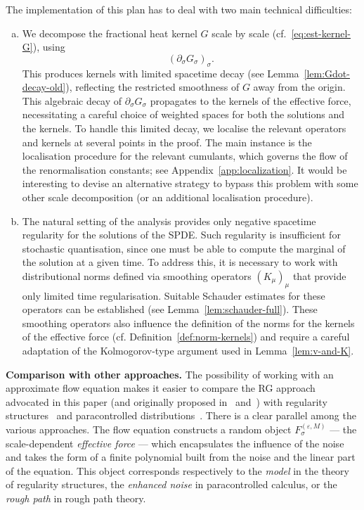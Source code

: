 \documentclass{article}
\numberwithin{equation}{section}
\theoremstyle{plain}
\theoremstyle{definition}
\begin{document}
The implementation of this plan has to deal with two main technical
difficulties:
\begin{enumerate}[(a)]
  \item We decompose the fractional heat kernel $G$ scale by scale
  (cf.~\eqref{eq:est-kernel-G}), using
  \[ (\partial_{\sigma} G_{\sigma})_{\sigma}. \]
  This produces kernels with limited spacetime decay (see
  Lemma~\ref{lem:Gdot-decay-old}), reflecting the restricted smoothness of $G$ away
  from the origin. This algebraic decay of $\partial_{\sigma} G
  _{\sigma}$ propagates to the kernels of the effective force, necessitating a
  careful choice of weighted spaces for both the solutions and the kernels. To
  handle this limited decay, we localise the relevant operators and kernels at
  several points in the proof. The main instance is the localisation procedure
  for the relevant cumulants, which governs the flow of the renormalisation
  constants; see Appendix~\ref{app:localization}. It would be
  interesting to devise an alternative strategy to bypass this problem with
  some other scale decomposition (or an additional localisation procedure).
  
  \item The natural setting of the analysis provides only negative spacetime
  regularity for the solutions of the SPDE. Such regularity is insufficient
  for stochastic quantisation, since one must be able to compute the marginal
  of the solution at a given time. To address this, it is necessary to work
  with distributional norms defined via smoothing operators $(K_{\mu})_{\mu}$
  that provide only limited time regularisation. Suitable Schauder estimates
  for these operators can be established (see Lemma~\ref{lem:schauder-full}).
  These smoothing operators also influence the definition of the norms for the
  kernels of the effective force (cf. Definition~\ref{def:norm-kernels}) and require
  a careful adaptation of the Kolmogorov-type argument used in
  Lemma~\ref{lem:v-and-K}.
\end{enumerate}


{\noindent}\textbf{Comparison with other approaches.} The possibility of
working with an approximate flow equation makes it easier to compare the RG
approach advocated in this paper (and originally proposed
in~{\cite{kupiainen2016renormalization}}
and~{\cite{duchFlowEquationApproach2021,duchRenormalizationSingularElliptic2022}})
with regularity structures~{\cite{hairer2014theory}} and paracontrolled
distributions~{\cite{gubinelli2015paracontrolled}}. There is a clear parallel
among the various approaches. The flow equation constructs a random object
$F_{\sigma}^{(\varepsilon, M)}$ --- the scale-dependent {\textit{effective
force}} --- which encapsulates the influence of the noise and takes the form
of a finite polynomial built from the noise and the linear part of the
equation. This object corresponds respectively to the {\textit{model}} in the
theory of regularity structures, the {\textit{enhanced noise}} in paracontrolled
calculus, or the {\textit{rough path}} in rough path theory.
\end{document}
